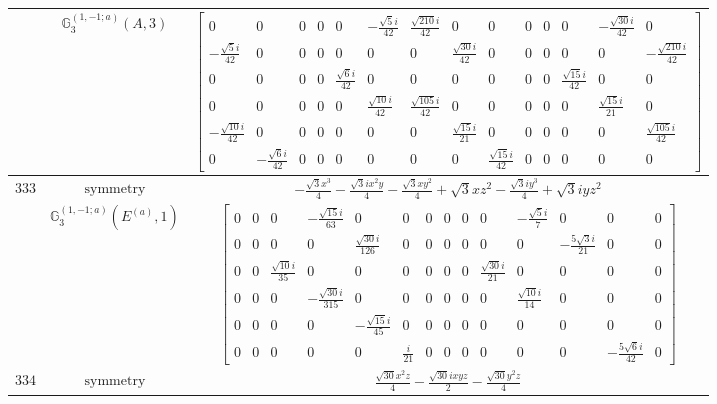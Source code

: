 \documentclass[fleqn,8pt,landscape]{jsarticle}
\begin{document}
\begin{longtable}{ccc}
$  $ & $ \mathbb{G}_{3}^{(1,-1;a)}(A,3) $ & $ \begin{bmatrix} 0 & 0 & 0 & 0 & 0 & - \frac{\sqrt{5} i}{42} & \frac{\sqrt{210} i}{42} & 0 & 0 & 0 & 0 & 0 & - \frac{\sqrt{30} i}{42} & 0 \\ - \frac{\sqrt{5} i}{42} & 0 & 0 & 0 & 0 & 0 & 0 & \frac{\sqrt{30} i}{42} & 0 & 0 & 0 & 0 & 0 & - \frac{\sqrt{210} i}{42} \\ 0 & 0 & 0 & 0 & \frac{\sqrt{6} i}{42} & 0 & 0 & 0 & 0 & 0 & 0 & \frac{\sqrt{15} i}{42} & 0 & 0 \\ 0 & 0 & 0 & 0 & 0 & \frac{\sqrt{10} i}{42} & \frac{\sqrt{105} i}{42} & 0 & 0 & 0 & 0 & 0 & \frac{\sqrt{15} i}{21} & 0 \\ - \frac{\sqrt{10} i}{42} & 0 & 0 & 0 & 0 & 0 & 0 & \frac{\sqrt{15} i}{21} & 0 & 0 & 0 & 0 & 0 & \frac{\sqrt{105} i}{42} \\ 0 & - \frac{\sqrt{6} i}{42} & 0 & 0 & 0 & 0 & 0 & 0 & \frac{\sqrt{15} i}{42} & 0 & 0 & 0 & 0 & 0 \end{bmatrix} $ \\ \hline
$ 333 $ & $ \text{symmetry} $ & $ - \frac{\sqrt{3} x^{3}}{4} - \frac{\sqrt{3} i x^{2} y}{4} - \frac{\sqrt{3} x y^{2}}{4} + \sqrt{3} x z^{2} - \frac{\sqrt{3} i y^{3}}{4} + \sqrt{3} i y z^{2} $ \\
$  $ & $ \mathbb{G}_{3}^{(1,-1;a)}(E^{(a)},1) $ & $ \begin{bmatrix} 0 & 0 & 0 & - \frac{\sqrt{15} i}{63} & 0 & 0 & 0 & 0 & 0 & 0 & - \frac{\sqrt{5} i}{7} & 0 & 0 & 0 \\ 0 & 0 & 0 & 0 & \frac{\sqrt{30} i}{126} & 0 & 0 & 0 & 0 & 0 & 0 & - \frac{5 \sqrt{3} i}{21} & 0 & 0 \\ 0 & 0 & \frac{\sqrt{10} i}{35} & 0 & 0 & 0 & 0 & 0 & 0 & \frac{\sqrt{30} i}{21} & 0 & 0 & 0 & 0 \\ 0 & 0 & 0 & - \frac{\sqrt{30} i}{315} & 0 & 0 & 0 & 0 & 0 & 0 & \frac{\sqrt{10} i}{14} & 0 & 0 & 0 \\ 0 & 0 & 0 & 0 & - \frac{\sqrt{15} i}{45} & 0 & 0 & 0 & 0 & 0 & 0 & 0 & 0 & 0 \\ 0 & 0 & 0 & 0 & 0 & \frac{i}{21} & 0 & 0 & 0 & 0 & 0 & 0 & - \frac{5 \sqrt{6} i}{42} & 0 \end{bmatrix} $ \\ \hline
$ 334 $ & $ \text{symmetry} $ & $ \frac{\sqrt{30} x^{2} z}{4} - \frac{\sqrt{30} i x y z}{2} - \frac{\sqrt{30} y^{2} z}{4} $ \\

\end{longtable}
\end{document}
